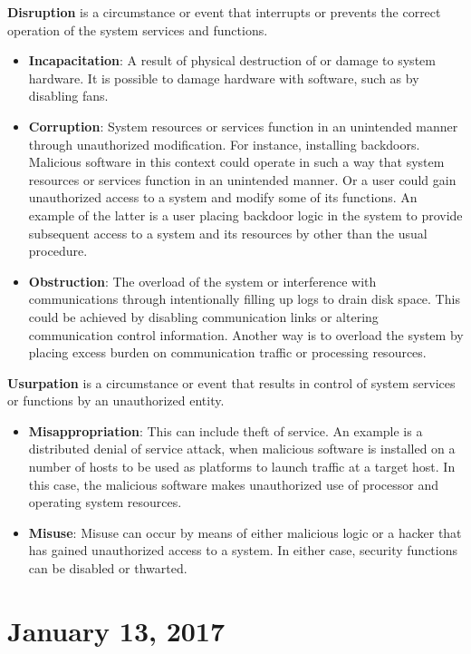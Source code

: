 \documentclass[11pt]{article}
\theoremstyle{plain} %
\theoremstyle{definition}
\theoremstyle{example}
\theoremstyle{remark}
\begin{document}
\textbf{Disruption} is a circumstance or event that interrupts or prevents the correct operation of the system services and functions. 
\begin{itemize}
	\item \textbf{Incapacitation}: A result of physical destruction of or damage to system hardware. It is possible to damage hardware with software, such as by disabling fans. 
	\item \textbf{Corruption}: System resources or services function in an unintended manner through unauthorized modification. For instance, installing backdoors. Malicious software in this context could operate in such a way that system resources or services function in an unintended manner. Or a user could gain unauthorized access to a system and modify some of its functions. An example of the latter is a user placing backdoor logic in the system to provide subsequent access to a system and its resources by other than the usual procedure.
	\item \textbf{Obstruction}: The overload of the system or interference with communications through intentionally filling up logs to drain disk space. This could be achieved by disabling communication links or altering communication control information. Another way is to overload the system by placing excess burden on communication traffic or processing resources.

\end{itemize}

\textbf{Usurpation} is a circumstance or event that results in control of system services or 
functions by an unauthorized entity. 
\begin{itemize}
	\item \textbf{Misappropriation}: This can include theft of service. An example is a distributed denial of service attack, when malicious software is installed on a number of hosts to be used as platforms to launch traffic at a target host. In this case, the malicious software makes unauthorized use of processor and operating system resources.
	\item \textbf{Misuse}: Misuse can occur by means of either malicious logic or a hacker that has gained unauthorized access to a system. In either case, security functions can be disabled or thwarted.
\end{itemize}

\section{January 13, 2017}
\end{document}
